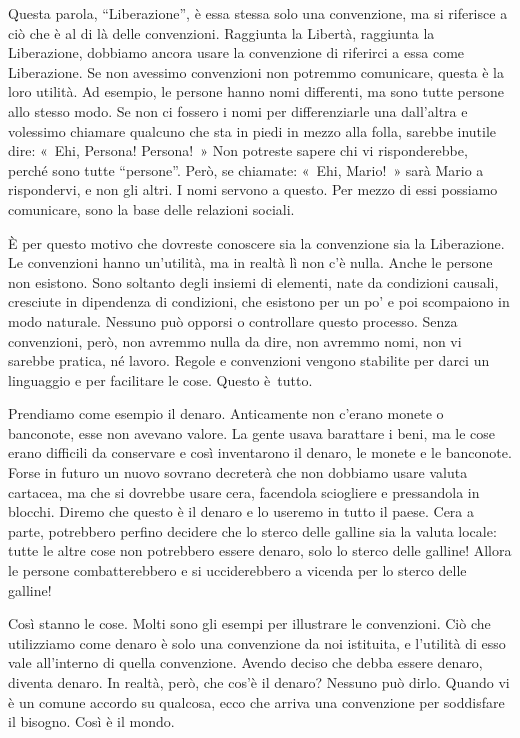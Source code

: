 Questa parola, ``Liberazione'', è essa stessa solo una convenzione, ma
si riferisce a ciò che è al di là delle convenzioni. Raggiunta la
Libertà, raggiunta la Liberazione, dobbiamo ancora usare la convenzione
di riferirci a essa come Liberazione. Se non avessimo convenzioni non
potremmo comunicare, questa è la loro utilità. Ad esempio, le persone
hanno nomi differenti, ma sono tutte persone allo stesso modo. Se non ci
fossero i nomi per differenziarle una dall'altra e volessimo chiamare
qualcuno che sta in piedi in mezzo alla folla, sarebbe inutile dire:
«~Ehi, Persona! Persona!~» Non potreste sapere chi vi risponderebbe,
perché sono tutte ``persone''. Però, se chiamate: «~Ehi, Mario!~» sarà
Mario a rispondervi, e non gli altri. I nomi servono a questo. Per mezzo
di essi possiamo comunicare, sono la base delle relazioni sociali.

È per questo motivo che dovreste conoscere sia la convenzione sia la
Liberazione. Le convenzioni hanno un'utilità, ma in realtà lì non c'è
nulla. Anche le persone non esistono. Sono soltanto degli insiemi di
elementi, nate da condizioni causali, cresciute in dipendenza di
condizioni, che esistono per un po' e poi scompaiono in modo naturale.
Nessuno può opporsi o controllare questo processo. Senza convenzioni,
però, non avremmo nulla da dire, non avremmo nomi, non vi sarebbe
pratica, né lavoro. Regole e convenzioni vengono stabilite per darci un
linguaggio e per facilitare le cose. Questo è~tutto.

Prendiamo come esempio il denaro. Anticamente non c'erano monete o
banconote, esse non avevano valore. La gente usava barattare i beni, ma
le cose erano difficili da conservare e così inventarono il denaro, le
monete e le banconote. Forse in futuro un nuovo sovrano decreterà che
non dobbiamo usare valuta cartacea, ma che si dovrebbe usare cera,
facendola sciogliere e pressandola in blocchi. Diremo che questo è il
denaro e lo useremo in tutto il paese. Cera a parte, potrebbero perfino
decidere che lo sterco delle galline sia la valuta locale: tutte le
altre cose non potrebbero essere denaro, solo lo sterco delle galline!
Allora le persone combatterebbero e si ucciderebbero a vicenda per lo
sterco delle galline!

Così stanno le cose. Molti sono gli esempi per illustrare le
convenzioni. Ciò che utilizziamo come denaro è solo una convenzione da
noi istituita, e l'utilità di esso vale all'interno di quella
convenzione. Avendo deciso che debba essere denaro, diventa denaro. In
realtà, però, che cos'è il denaro? Nessuno può dirlo. Quando vi è un
comune accordo su qualcosa, ecco che arriva una convenzione per
soddisfare il bisogno. Così è il mondo.

